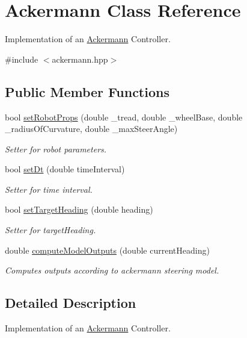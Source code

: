 \hypertarget{classAckermann}{}\section{Ackermann Class Reference}
\label{classAckermann}


Implementation of an \hyperlink{classAckermann}{Ackermann} Controller.  




{\ttfamily \#include $<$ackermann.\+hpp$>$}

\subsection*{Public Member Functions}
\begin{DoxyCompactItemize}
\item 
bool \hyperlink{classAckermann_a70edfb9472f629092736004586a5b3ce}{set\+Robot\+Props} (double \+\_\+tread, double \+\_\+wheel\+Base, double \+\_\+radius\+Of\+Curvature, double \+\_\+max\+Steer\+Angle)
\begin{DoxyCompactList}\small\item\em Setter for robot parameters. \end{DoxyCompactList}\item 
bool \hyperlink{classAckermann_ac849806d5f7fa705afd1691d0e1564ab}{set\+Dt} (double time\+Interval)
\begin{DoxyCompactList}\small\item\em Setter for time interval. \end{DoxyCompactList}\item 
bool \hyperlink{classAckermann_ae03561a8d47231a26dcbb0e8661b29b1}{set\+Target\+Heading} (double heading)
\begin{DoxyCompactList}\small\item\em Setter for target\+Heading. \end{DoxyCompactList}\item 
double \hyperlink{classAckermann_a6d7fa80feb037e7964e2c6b5044df615}{compute\+Model\+Outputs} (double current\+Heading)
\begin{DoxyCompactList}\small\item\em Computes outputs according to ackermann steering model. \end{DoxyCompactList}\end{DoxyCompactItemize}


\subsection{Detailed Description}
Implementation of an \hyperlink{classAckermann}{Ackermann} Controller. 

